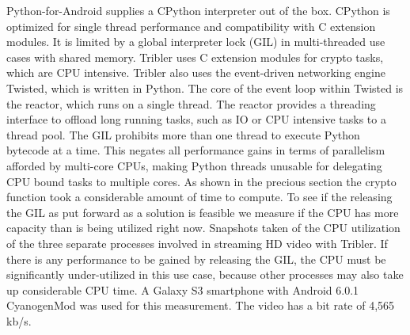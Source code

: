 Python-for-Android supplies a CPython interpreter out of the box.
CPython is optimized for single thread performance and compatibility with C extension modules.
It is limited by a global interpreter lock (GIL) in multi-threaded use cases with shared memory.
Tribler uses C extension modules for crypto tasks, which are CPU intensive.
Tribler also uses the event-driven networking engine Twisted, which is written in Python.
The core of the event loop within Twisted is the reactor, which runs on a single thread.
The reactor provides a threading interface to offload long running tasks, such as IO or CPU intensive tasks to a thread pool.
The GIL prohibits more than one thread to execute Python bytecode at a time.
This negates all performance gains in terms of parallelism afforded by multi-core CPUs, making Python threads unusable for delegating CPU bound tasks to multiple cores.
As shown in the precious section the crypto function took a considerable amount of time to compute.
To see if the releasing the GIL as put forward as a solution is feasible we measure if the CPU has more capacity than is being utilized right now.
Snapshots taken of the CPU utilization of the three separate processes involved in streaming HD video with Tribler.
If there is any performance to be gained by releasing the GIL, the CPU must be significantly under-utilized in this use case, because other processes may also take up considerable CPU time.
A Galaxy S3 smartphone with Android 6.0.1 CyanogenMod was used for this measurement.
The video has a bit rate of 4,565 kb/s.
